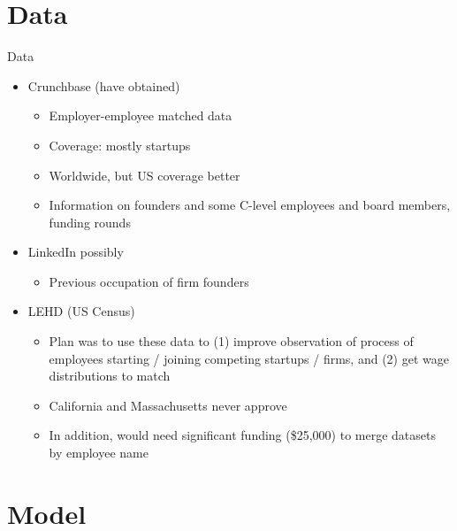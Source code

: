 \documentclass[english,usenames,dvipsnames]{beamer}
\begin{document}
\section{Data}
\begin{frame}{Data}
\begin{itemize}
	\item Crunchbase (have obtained)
	\begin{itemize}
		\item Employer-employee matched data
		\item Coverage: mostly startups 
		\item Worldwide, but US coverage better
		\item Information on founders and some C-level employees and board members, funding rounds 
	\end{itemize}
	\item LinkedIn possibly
	\begin{itemize}
		\item Previous occupation of firm founders
	\end{itemize}

	\item LEHD (US Census)
	\begin{itemize}
		\item Plan was to use these data to (1) improve observation of process of employees starting / joining competing startups / firms, and (2) get wage distributions to match 
		\item California and Massachusetts never approve
		\item In addition, would need significant funding (\$25,000) to merge datasets by employee name 
	\end{itemize}
\end{itemize}
\end{frame}

\section{Model}
\end{document}
